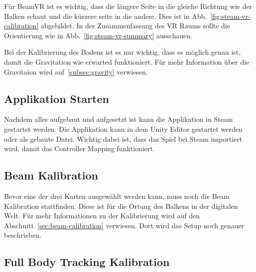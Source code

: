 Für BeamVR ist es wichtig, dass die längere Seite in die gleiche Richtung wie der Balken schaut und die kürzere seite in die andere.
Dies ist in Abb.~\ref{fig:steam-vr-calibration} abgebildet.
In der Zusammenfassung des VR Raums sollte die Orientierung wie in Abb.~\ref{fig:steam-vr-summary} ausschauen.

Bei der Kalibrierung des Bodens ist es nur wichtig, dass es möglich genau ist, damit die Gravitation wie erwarted funktioniert.
Für mehr Information über die Gravitaion wird auf~\ref{subsec:gravity} verwiesen.

\subsection{Applikation Starten}\label{subsec:run-application}

Nachdem alles aufgebaut und aufgesetzt ist kann die Applikation in Steam gestartet werden.
Die Applikation kann in dem Unity Editor gestartet werden oder als gebaute Datei.
Wichtig dabei ist, dass das Spiel bei Steam importiert wird, damit das Controller Mapping funktioniert.

\subsection{Beam Kalibration}

Bevor eine der drei Karten ausgewählt werden kann, muss noch die Beam Kalibration stattfinden.
Diese ist für die Ortung des Balkens in der digitalen Welt.
Für mehr Informationen zu der Kalibrierung wird auf den Abschnitt~\ref{sec:beam-calibration} verwiesen.
Dort wird das Setup noch genauer beschrieben.

\subsection{Full Body Tracking Kalibration}\label{subsec:full-body-tracking-calibration}

